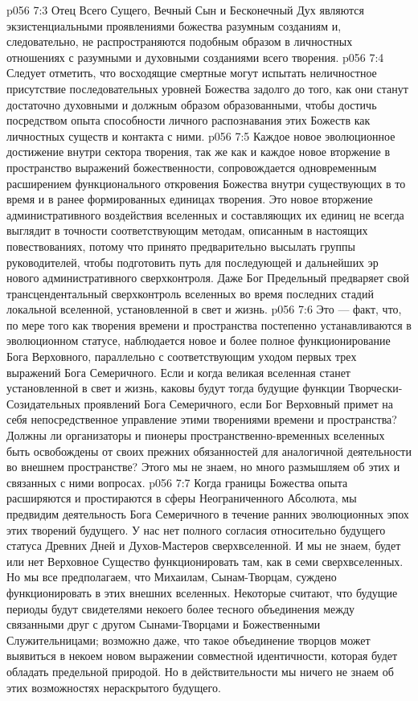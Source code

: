 \vs p056 7:3 \pc Отец Всего Сущего, Вечный Сын и Бесконечный Дух являются экзистенциальными проявлениями божества разумным созданиям и, следовательно, не распространяются подобным образом в личностных отношениях с разумными и духовными созданиями всего творения.
\vs p056 7:4 \pc Следует отметить, что восходящие смертные могут испытать неличностное присутствие последовательных уровней Божества задолго до того, как они станут достаточно духовными и должным образом образованными, чтобы достичь посредством опыта способности личного распознавания этих Божеств как личностных существ и контакта с ними.
\vs p056 7:5 Каждое новое эволюционное достижение внутри сектора творения, так же как и каждое новое вторжение в пространство выражений божественности, сопровождается одновременным расширением функционального откровения Божества внутри существующих в то время и в ранее формированных единицах творения. Это новое вторжение административного воздействия вселенных и составляющих их единиц не всегда выглядит в точности соответствующим методам, описанным в настоящих повествованиях, потому что принято предварительно высылать группы руководителей, чтобы подготовить путь для последующей и дальнейших эр нового административного сверхконтроля. Даже Бог Предельный предваряет свой трансцендентальный сверхконтроль вселенных во время последних стадий локальной вселенной, установленной в свет и жизнь.
\vs p056 7:6 Это --- факт, что, по мере того как творения времени и пространства постепенно устанавливаются в эволюционном статусе, наблюдается новое и более полное функционирование Бога Верховного, параллельно с соответствующим уходом первых трех выражений Бога Семеричного. Если и когда великая вселенная станет установленной в свет и жизнь, каковы будут тогда будущие функции Творчески\hyp{}Созидательных проявлений Бога Семеричного, если Бог Верховный примет на себя непосредственное управление этими творениями времени и пространства? Должны ли организаторы и пионеры пространственно\hyp{}временных вселенных быть освобождены от своих прежних обязанностей для аналогичной деятельности во внешнем пространстве? Этого мы не знаем, но много размышляем об этих и связанных с ними вопросах.
\vs p056 7:7 \pc Когда границы Божества опыта расширяются и простираются в сферы Неограниченного Абсолюта, мы предвидим деятельность Бога Семеричного в течение ранних эволюционных эпох этих творений будущего. У нас нет полного согласия относительно будущего статуса Древних Дней и Духов\hyp{}Мастеров сверхвселенной. И мы не знаем, будет или нет Верховное Существо функционировать там, как в семи сверхвселенных. Но мы все предполагаем, что Михаилам, Сынам\hyp{}Творцам, суждено функционировать в этих внешних вселенных. Некоторые считают, что будущие периоды будут свидетелями некоего более тесного объединения между связанными друг с другом Сынами\hyp{}Творцами и Божественными Служительницами; возможно даже, что такое объединение творцов может выявиться в некоем новом выражении совместной идентичности, которая будет обладать предельной природой. Но в действительности мы ничего не знаем об этих возможностях нераскрытого будущего.
